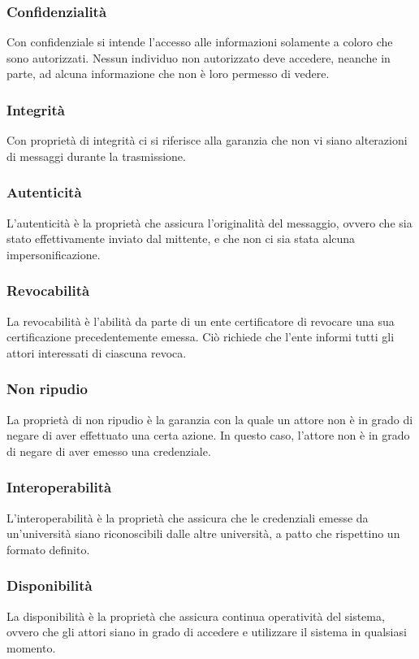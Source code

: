\documentclass[a4paper,12pt]{article}
\begin{document}
\subsubsection{Confidenzialità}
Con confidenziale si intende l'accesso alle informazioni solamente a coloro che sono autorizzati. Nessun individuo non autorizzato deve accedere, neanche in parte, ad alcuna informazione che non è loro permesso di vedere.
\subsubsection{Integrità}
Con proprietà di integrità ci si riferisce alla garanzia che non vi siano alterazioni di messaggi durante la trasmissione. 
\subsubsection{Autenticità}
L'autenticità è la proprietà che assicura l'originalità del messaggio, ovvero che sia stato effettivamente inviato dal mittente, e che non ci sia stata alcuna impersonificazione.
\subsubsection{Revocabilità}
La revocabilità è l'abilità da parte di un ente certificatore di revocare una sua certificazione precedentemente emessa. Ciò richiede che l'ente informi tutti gli attori interessati di ciascuna revoca.
\subsubsection{Non ripudio}
La proprietà di non ripudio è la garanzia con la quale un attore non è in grado di negare di aver effettuato una certa azione. In questo caso, l'attore non è in grado di negare di aver emesso una credenziale.
\subsubsection{Interoperabilità}
L'interoperabilità è la proprietà che assicura che le credenziali emesse da un'università siano riconoscibili dalle altre università, a patto che rispettino un formato definito.
\subsubsection{Disponibilità}
La disponibilità è la proprietà che assicura continua operatività del sistema, ovvero che gli attori siano in grado di accedere e utilizzare il sistema in qualsiasi momento.
\end{document}
